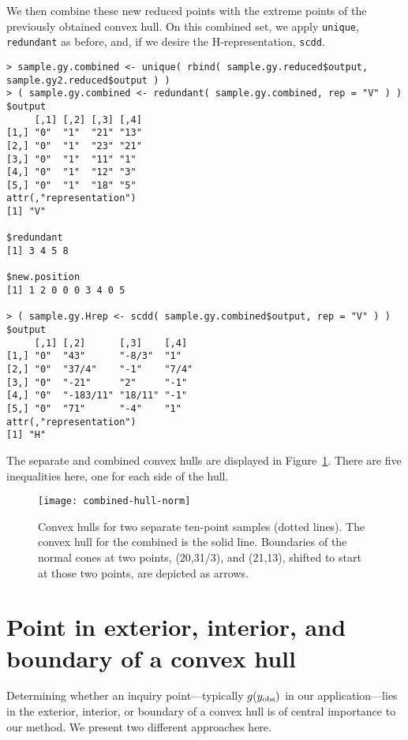 We then combine these new reduced points with the extreme points of the previously
obtained convex hull.  On this combined set, we apply \texttt{unique}, 
\texttt{redundant} as before, and, if we desire the H-representation, \texttt{scdd}.
{ \singlespace
\begin{verbatim}
> sample.gy.combined <- unique( rbind( sample.gy.reduced$output, 
sample.gy2.reduced$output ) )
> ( sample.gy.combined <- redundant( sample.gy.combined, rep = "V" ) )
$output
     [,1] [,2] [,3] [,4]
[1,] "0"  "1"  "21" "13"
[2,] "0"  "1"  "23" "21"
[3,] "0"  "1"  "11" "1" 
[4,] "0"  "1"  "12" "3" 
[5,] "0"  "1"  "18" "5" 
attr(,"representation")
[1] "V"

$redundant
[1] 3 4 5 8

$new.position
[1] 1 2 0 0 0 3 4 0 5

> ( sample.gy.Hrep <- scdd( sample.gy.combined$output, rep = "V" ) )
$output
     [,1] [,2]      [,3]    [,4] 
[1,] "0"  "43"      "-8/3"  "1"  
[2,] "0"  "37/4"    "-1"    "7/4"
[3,] "0"  "-21"     "2"     "-1" 
[4,] "0"  "-183/11" "18/11" "-1" 
[5,] "0"  "71"      "-4"    "1"  
attr(,"representation")
[1] "H"
\end{verbatim}
}
The separate and combined convex hulls are displayed in Figure~\ref{F:combined-hull}.
There are five inequalities here, one for each side of the hull.
\begin{figure}[h!]
\begin{center}
\texttt{[image: combined-hull-norm]}
\end{center}
\caption[Convex hulls for two separate samples]
{Convex hulls for two separate ten-point samples (dotted lines).  The 
convex hull for the combined is the solid line.  Boundaries of the normal cones
at two points, (20,31/3), and (21,13), shifted to start at those two points, are depicted as arrows.}
\label{F:combined-hull}
\end{figure}


\section{Point in exterior, interior, and boundary of a convex hull}
Determining whether an inquiry point---typically $g(y_{\text{obs}})$ in our application---lies
 in the exterior, interior, or boundary of a convex hull is of central 
 importance to our method.  
We present two different approaches here.

